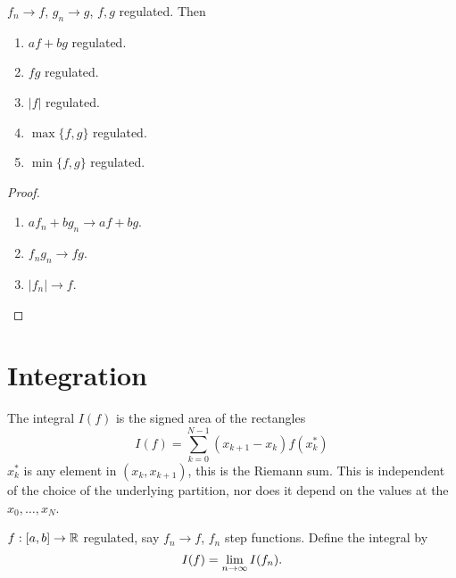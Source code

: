 \documentclass[10pt, a4paper]{article}
\begin{document}
\begin{proposition}
    $f_n \to f$,
    $g_n \to g$,
    $f, g$ regulated.
    Then
    \begin{enumerate}[label = (\roman*)]
        \item $af + bg$ regulated.

        \item $fg$ regulated.

        \item $|f|$ regulated.
        
        \item $\max\{f, g\}$ regulated.
        
        \item $\min\{f, g\}$ regulated.
    \end{enumerate}

    \begin{proof}
        \begin{enumerate}[label = (\roman*)]
            \item $af_n + bg_n \to af + bg$.

            \item $f_ng_n \to fg$.

            \item $|f_n| \to f$.
        \end{enumerate}
    \end{proof}
\end{proposition}

\newpage

\section{Integration}

The integral $I(f)$ is the signed area of the rectangles
\[
I(f) = \sum_{k = 0}^{N - 1}(x_{k + 1} - x_k)f(x_k ^ {*})
\]
$x_k ^ {*}$ is any element in $(x_k, x_{k + 1})$,
this is the Riemann sum.
This is independent of the choice of the underlying partition,
nor does it depend on the values at the $x_0, \dotsc, x_N$.

\begin{definition}
    $f : [a, b] \to \mathbb{R}$ regulated,
    say $f_n \to f$,
    $f_n$ step functions.
    Define the integral by
    \[
    I(f) = \lim_{n \rightarrow \infty} I(f_n).
    \]
\end{definition}
\end{document}
